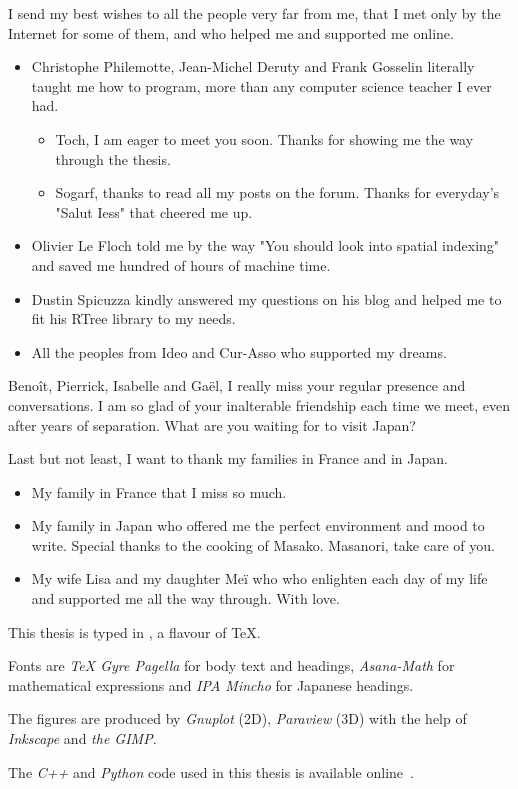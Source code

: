 I send my best wishes to all the people very far from me, that I met only by the Internet for some of them, and who helped me and supported me online.
\begin{itemize}
	\item Christophe Philemotte, Jean-Michel Deruty and Frank Gosselin literally taught me how to program, more than any computer science teacher I ever had.
	\begin{itemize}
		\item Toch, I am eager to meet you soon. Thanks for showing me the way through the thesis.
		\item Sogarf, thanks to read all my posts on the forum. Thanks for everyday's "Salut Iess" that cheered me up.
	\end{itemize}
	\item Olivier Le Floch told me by the way "You should look into spatial indexing" and saved me hundred of hours of machine time.
	\item Dustin Spicuzza kindly answered my questions on his blog and helped me to fit his RTree library to my needs.
	\item All the peoples from Ideo and Cur-Asso who supported my dreams.
\end{itemize}

Benoît, Pierrick, Isabelle and Gaël, I really miss your regular presence and conversations. I am so glad of your inalterable friendship each time we meet, even after years of separation. What are you waiting for to visit Japan?

Last but not least, I want to thank my families in France and in Japan.
\begin{itemize}
	\item My family in France that I miss so much.
	\item My family in Japan who offered me the perfect environment and mood to write. Special thanks to the cooking of Masako. Masanori, take care of you.
	\item My wife Lisa and my daughter Meï who who enlighten each day of my life and supported me all the way through. With love.
\end{itemize}


This thesis is typed in \XeTeX, a flavour of \TeX.

Fonts are \emph{TeX Gyre Pagella} for body text and headings, \emph{Asana-Math} for mathematical expressions and \emph{IPA Mincho} for Japanese headings.

The figures are produced by \emph{Gnuplot} (2D), \emph{Paraview} (3D) with the help of \emph{Inkscape} and \emph{the GIMP}.

The \emph{C++} and \emph{Python} code used in this thesis is available online~\citep{LeocmachColloids}.